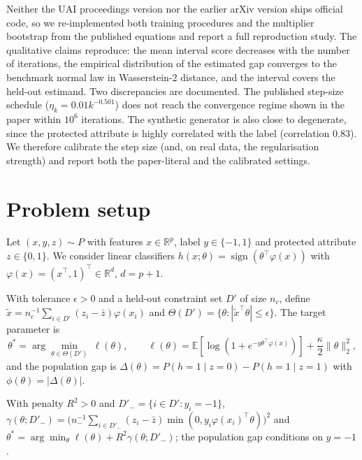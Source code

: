 \documentclass[pdflatex,sn-basic]{sn-jnl}
\newcommand{\E}{\mathbb{E}}
\newcommand{\R}{\mathbb{R}}
\newcommand{\Dp}{D'}
\begin{document}
Neither the UAI proceedings version nor the earlier arXiv version \citep{roy2023uq} ships official code, so we
re-implemented both training procedures and the multiplier bootstrap from the published equations and
report a full reproduction study.  The qualitative claims reproduce: the mean interval score
decreases with the number of iterations, the empirical distribution of the estimated gap converges to
the benchmark normal law in Wasserstein-2 distance, and the interval covers the held-out estimand.
Two discrepancies are documented.  The published step-size schedule ($\eta_k=0.01k^{-0.501}$) does not reach the convergence regime shown in the paper within $10^6$ iterations.  The synthetic generator
is also close to degenerate, since the protected attribute is highly correlated with the label
(correlation $0.83$).  We
therefore calibrate the step size (and, on real data, the regularisation strength) and report both
the paper-literal and the calibrated settings.

\section{Problem setup}
\label{sec:setup}


Let $(x,y,z)\sim P$ with features $x\in\R^p$, label
$y\in\{-1,1\}$ and protected attribute $z\in\{0,1\}$.  We consider linear classifiers
$h(x;\theta)=\operatorname{sign}(\theta^\top\varphi(x))$ with $\varphi(x)=(x^\top,1)^\top
\in\R^d$, $d=p+1$.


With tolerance $\epsilon>0$ and a held-out constraint set
$\Dp$ of size $n_c$, define
$\tilde x=n_c^{-1}\sum_{i\in\Dp}(z_i-\bar z)\varphi(x_i)$ and
$\Theta(\Dp)=\{\theta:|\tilde x^\top\theta|\le\epsilon\}$.  The target parameter is
\begin{equation}\label{eq:theta}
\theta^*=\arg\min_{\theta\in\Theta(\Dp)}\ \ell(\theta),\qquad
\ell(\theta)=\E[\log(1+e^{-y\theta^\top\varphi(x)})]+\frac{\kappa}{2}\|\theta\|_2^2 ,
\end{equation}
and the population gap is $\Delta(\theta)=P(h=1\mid z=0)-P(h=1\mid z=1)$ with
$\phi(\theta)=|\Delta(\theta)|$.


With penalty $R^2>0$ and $\Dp_-=\{i\in\Dp:y_i=-1\}$,
$\gamma(\theta;\Dp_-)=\big(n_-^{-1}\sum_{i\in\Dp_-}(z_i-\bar z)\min(0,y_i\varphi(x_i)^\top
\theta)\big)^2$ and $\theta^*=\arg\min_\theta \ell(\theta)+R^2\gamma(\theta;\Dp_-)$; the population
gap conditions on $y=-1$.
\end{document}
